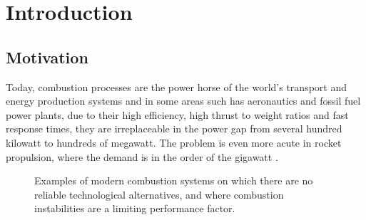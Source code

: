 \chapter{Introduction}
\section{Motivation}
Today, combustion processes are the power horse of the world's transport and energy production systems and in some areas such has aeronautics and fossil fuel power plants, due to their high efficiency, high thrust to weight ratios and fast response times, they are irreplaceable in the power gap from several hundred kilowatt to hundreds of megawatt. The problem is even more acute in rocket propulsion, where the demand is in the order of the gigawatt \cite{nato}.

\begin{figure}[!htb]
	\begin{subfigmatrix}{2}
	\end{subfigmatrix}
	\caption{Examples of modern combustion systems on which there are no reliable technological alternatives, and where combustion instabilities are a limiting performance factor.}
	\label{engines}
\end{figure}


